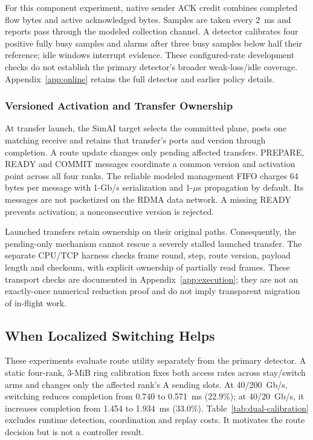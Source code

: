 \documentclass[sigconf]{acmart}
\begin{document}
For this component experiment, native sender ACK credit combines completed
flow bytes and active acknowledged bytes. Samples are taken every 2~ms and
reports pass through the modeled collection channel. A detector calibrates four positive fully
busy samples and alarms after three busy samples below half their reference;
idle windows interrupt evidence. These configured-rate development checks
do not establish the primary detector's broader weak-loss/idle coverage.
Appendix~\ref{app:online} retains the full detector and earlier policy details.

\subsubsection{Versioned Activation and Transfer Ownership}
At transfer launch, the SimAI target selects the committed plane, posts
one matching receive and retains that transfer's ports and version through
completion. A route update changes only pending affected transfers.
PREPARE, READY and COMMIT messages coordinate a common version and
activation point across all four ranks. The reliable modeled management
FIFO charges 64 bytes per message with 1-Gb/s serialization and 1-$\mu$s
propagation by default. Its messages are not packetized on the RDMA data
network. A missing READY prevents activation; a nonconsecutive version is
rejected.

Launched transfers retain ownership on their original paths. Consequently,
the pending-only mechanism cannot rescue a severely stalled launched
transfer. The separate CPU/TCP harness checks frame round, step, route
version, payload length and checksum, with explicit ownership of partially
read frames. These transport checks are documented in
Appendix~\ref{app:execution}; they are not an exactly-once numerical reduction
proof and do not imply transparent migration of in-flight work.

\subsection{When Localized Switching Helps}
\label{sec:route-results}
These experiments evaluate route utility separately from the primary
detector. A static four-rank, 3-MiB ring calibration fixes both access
rates across stay/switch arms and changes only the affected rank's A
sending slots. At 40/200~Gb/s, switching reduces completion from 0.740
to 0.571~ms (22.9\%); at 40/20~Gb/s, it increases completion from 1.454
to 1.934~ms (33.0\%). Table~\ref{tab:dual-calibration} excludes runtime
detection, coordination and replay costs. It motivates the route decision
but is not a controller result.
\end{document}
